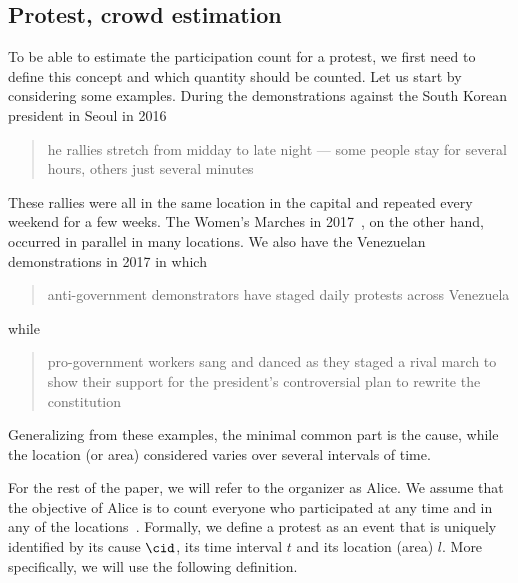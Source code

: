 \subsection{Protest,  crowd estimation}%
\label{protest-model}


To be able to estimate the participation count for a protest, we first need to define this concept and which quantity should be counted.
Let us start by considering some examples.
During the demonstrations against the South Korean president in Seoul in 2016
\blockcquote{2016DemonstrationsInSeoul}{%
  he rallies stretch from midday to late night --- some people stay for several hours, others just several minutes%
}.
These rallies were all in the same location in the capital and repeated every weekend for a few weeks.
The Women's Marches in 2017~\cite{2017WomensMarchesInUS}, on the other hand, occurred in parallel in many locations.
We also have the Venezuelan demonstrations in 2017 in which \blockcquote{2017VenezuelaProtestFrequency}{%
  anti-government demonstrators have staged daily protests across Venezuela%
} while
\blockcquote{AlJazeeraOnVenezuela2017}{%
  pro-government workers sang and danced as they staged a rival march to show their support for the president's controversial plan to rewrite the constitution%
}.
Generalizing from these examples, the minimal common part is the 
cause,\label{CauseIsTheCommonDenominator} while the location (or area) 
considered varies over several intervals of time.

For the rest of the paper, we will refer to the organizer as Alice.
We assume that the objective of Alice is to count everyone who participated at 
any time and in any of the locations~\cite{2016DemonstrationsInSeoul}. 
Formally, we define a protest as an event that is uniquely identified by its cause \(\cid\), its time interval \(t\) and its location (area) \(l\).
More specifically, we will use the following definition.

